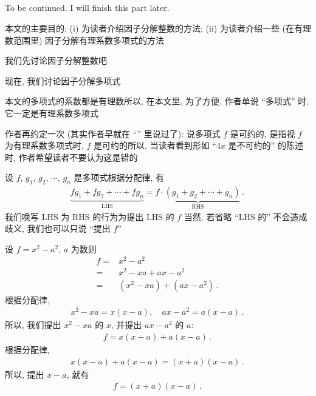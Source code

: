 \subsection*{\Factorization}
\markright{\Factorization}

To be continued. I will finish this part later.

本文的主要目的: (i) 为读者介绍因子分解整数的方法; (ii) 为读者介绍一些 (在有理数范围里) 因子分解有理系数多项式的方法\period

我们先讨论因子分解整数吧\period

\myLine

现在, 我们讨论因子分解多项式\period

本文的多项式的系数都是有理数\period 所以, 在本文里, 为了方便, 作者单说 ``多项式'' 时, 它一定是有理系数多项式\period

作者再约定一次 (其实作者早就在 ``\PolynomialsOverZAndOverQ '' 里说过了): 说多项式 $f$ 是可约的, 是指视 $f$ 为有理系数多项式时, $f$ 是可约的\period 所以, 当读者看到形如 ``$4x$ 是不可约的'' 的陈述时, 作者希望读者不要认为这是错的\period

\begin{definition}
    设 $f$, $g_1$, $g_2$, $\cdots$, $g_n$ 是多项式\period 根据分配律, 有
    \begin{align*}
        \underbrace{fg_1 + fg_2 + \cdots + fg_n}_{\text{LHS}} = \underbrace{f \cdot (g_1 + g_2 + \cdots + g_n)}_{\text{RHS}} \period
    \end{align*}
    我们唤写 LHS 为 RHS 的行为为提出 LHS 的 $f$ \period 当然, 若省略 ``LHS 的'' 不会造成歧义, 我们也可以只说 ``提出 $f$''\period
\end{definition}

\begin{example}
    设 $f = x^2 - a^2$, $a$ 为数\period 则
    \begin{align*}
        f
        = {} & x^2 - a^2                       \\
        = {} & x^2 - xa + ax - a^2             \\
        = {} & (x^2 - xa) + (ax - a^2) \period
    \end{align*}
    根据分配律,
    \begin{align*}
        x^2 - xa = x(x - a), \quad ax - a^2 = a(x - a) \period
    \end{align*}
    所以, 我们提出 $x^2 - xa$ 的 $x$, 并提出 $ax - a^2$ 的 $a$:
    \begin{align*}
        f = x(x - a) + a(x - a) \period
    \end{align*}
    根据分配律,
    \begin{align*}
        x(x - a) + a(x - a) = (x + a)(x - a) \period
    \end{align*}
    所以, 提出 $x-a$, 就有
    \begin{align*}
        f = (x + a)(x - a) \period
    \end{align*}
\end{example}


